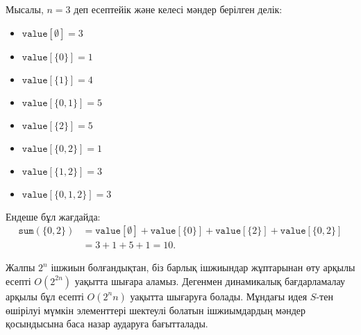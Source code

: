 Мысалы, $n=3$ деп есептейік және келесі мәндер берілген делік:
\begin{multicols}{2}
\begin{itemize}
\item $\texttt{value}[\emptyset] = 3$
\item $\texttt{value}[\{0\}] = 1$
\item $\texttt{value}[\{1\}] = 4$
\item $\texttt{value}[\{0,1\}] = 5$
\item $\texttt{value}[\{2\}] = 5$
\item $\texttt{value}[\{0,2\}] = 1$
\item $\texttt{value}[\{1,2\}] = 3$
\item $\texttt{value}[\{0,1,2\}] = 3$
\end{itemize}
\end{multicols}
Ендеше бұл жағдайда:
\begin{equation*}
\begin{split}
\texttt{sum}(\{0,2\}) &= \texttt{value}[\emptyset]+\texttt{value}[\{0\}]+\texttt{value}[\{2\}]+\texttt{value}[\{0,2\}] \\ 
                      &= 3 + 1 + 5 + 1 = 10.
\end{split}
\end{equation*}

Жалпы $2^n$ ішжиын болғандықтан, біз барлық
ішжиындар жұптарынан өту арқылы есепті $O(2^{2n})$ 
уақытта шығара аламыз. Дегенмен динамикалық бағдарламалау
арқылы бұл есепті $O(2^n n)$ уақытта шығаруға болады.
Мұндағы идея $S$-тен өшірілуі мүмкін элементтері шектеулі болатын ішжиымдардың мәндер қосындысына баса назар аударуға бағытталады. %


